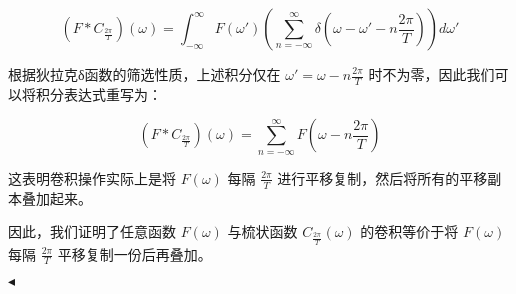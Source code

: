 \documentclass[11pt]{article}
\newenvironment{question}[2][Question]{\begin{trivlist}
\item[\hskip \labelsep {\bfseries #1}\hskip \labelsep {\bfseries #2.}]}{\hfill$\blacktriangleleft$\end{trivlist}}
\begin{document}
\begin{question}{1 (100') (梳状函数)}
\begin{enumerate}
    \[ (F * C_{\frac{2\pi}{T}})(\omega) = \int_{-\infty}^{\infty} F(\omega') \left( \sum_{n = -\infty}^{\infty} \delta(\omega - \omega' - n \frac{2\pi}{T}) \right) d\omega' \]

    根据狄拉克δ函数的筛选性质，上述积分仅在 \( \omega' = \omega - n \frac{2\pi}{T} \) 时不为零，因此我们可以将积分表达式重写为：

    \[ (F * C_{\frac{2\pi}{T}})(\omega) = \sum_{n = -\infty}^{\infty} F(\omega - n \frac{2\pi}{T}) \]

    这表明卷积操作实际上是将 \( F(\omega) \) 每隔 \( \frac{2\pi}{T} \) 进行平移复制，然后将所有的平移副本叠加起来。

    因此，我们证明了任意函数 \( F(\omega) \) 与梳状函数 \( C_{\frac{2\pi}{T}}(\omega) \) 的卷积等价于将 \( F(\omega) \) 每隔 \( \frac{2\pi}{T} \) 平移复制一份后再叠加。
    \end{enumerate} 
    
    \end{question}
\end{document}
